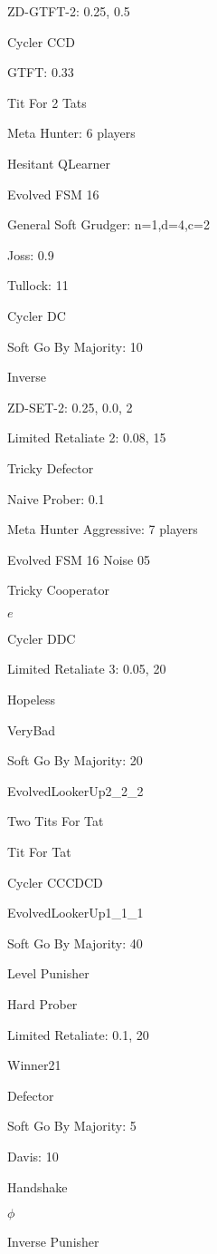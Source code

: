 \item ZD-GTFT-2: 0.25, 0.5
\item Cycler CCD
\item GTFT: 0.33
\item Tit For 2 Tats
\item Meta Hunter: 6 players
\item Hesitant QLearner
\item Evolved FSM 16
\item General Soft Grudger: n=1,d=4,c=2
\item Joss: 0.9
\item Tullock: 11
\item Cycler DC
\item Soft Go By Majority: 10
\item Inverse
\item ZD-SET-2: 0.25, 0.0, 2
\item Limited Retaliate 2: 0.08, 15
\item Tricky Defector
\item Naive Prober: 0.1
\item Meta Hunter Aggressive: 7 players
\item Evolved FSM 16 Noise 05
\item Tricky Cooperator
\item $e$
\item Cycler DDC
\item Limited Retaliate 3: 0.05, 20
\item Hopeless
\item VeryBad
\item Soft Go By Majority: 20
\item EvolvedLookerUp2\_2\_2
\item Two Tits For Tat
\item Tit For Tat
\item Cycler CCCDCD
\item EvolvedLookerUp1\_1\_1
\item Soft Go By Majority: 40
\item Level Punisher
\item Hard Prober
\item Limited Retaliate: 0.1, 20
\item Winner21
\item Defector
\item Soft Go By Majority: 5
\item Davis: 10
\item Handshake
\item $\phi$
\item Inverse Punisher
